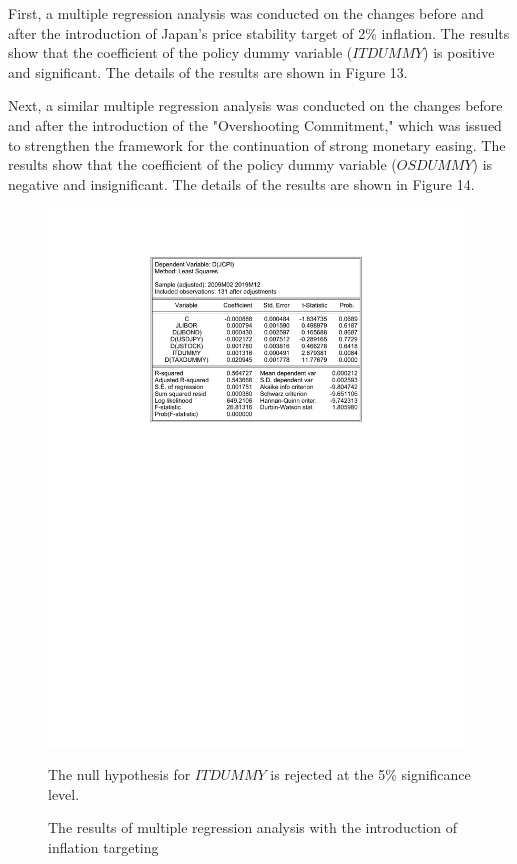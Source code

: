 \documentclass[12pt]{article}
\begin{document}
First, a multiple regression analysis was conducted on the changes before and after the introduction of Japan's price stability target of 2\% inflation.
The results show that the coefficient of the policy dummy variable ($ITDUMMY$) is positive and significant. The details of the results are shown in Figure 13.

Next, a similar multiple regression analysis was conducted on the changes before and after the introduction of the "Overshooting Commitment," which was issued to strengthen the framework for the continuation of strong monetary easing.
The results show that the coefficient of the policy dummy variable ($OSDUMMY$) is negative and insignificant. The details of the results are shown in Figure 14.

\newpage

\begin{figure}[!htbp]
    \centering
    \caption{The results of multiple regression analysis with the introduction of inflation targeting}
    \vspace{5pt}
    \includegraphics[width=11cm]{it.pdf}
    
    The null hypothesis for $ITDUMMY$ is rejected at the 5\% significance level.
\end{figure}
\end{document}
